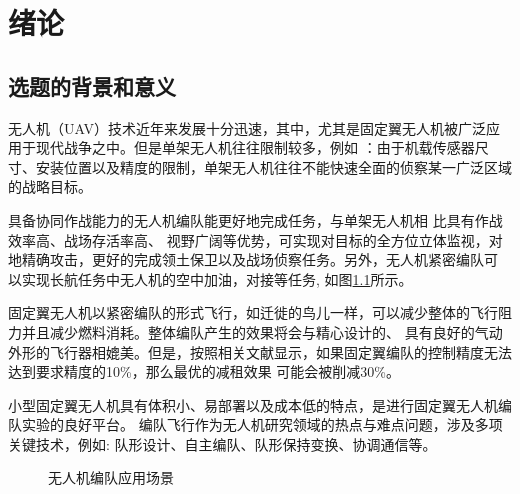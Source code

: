 %
%
%
%

\chapter{绪论}
\label{chap:intro}
\section{选题的背景和意义}
无人机（UAV）技术近年来发展十分迅速，其中，尤其是固定翼无人机被广泛应用于现代战争之中。但是单架无人机往往限制较多，例如
：由于机载传感器尺寸、安装位置以及精度的限制，单架无人机往往不能快速全面的侦察某一广泛区域的战略目标。

具备协同作战能力的无人机编队能更好地完成任务，与单架无人机相 比具有作战效率高、战场存活率高、
视野广阔等优势，可实现对目标的全方位立体监视，对地精确攻击，更好的完成领土保卫以及战场侦察任务。另外，无人机紧密编队可
以实现长航任务中无人机的空中加油，对接等任务, 如图\ref{fig:c01-meaning}所示。

固定翼无人机以紧密编队的形式飞行，如迁徙的鸟儿一样，可以减少整体的飞行阻力并且减少燃料消耗。整体编队产生的效果将会与精心设计的、
具有良好的气动外形的飞行器相媲美。但是，按照相关文献显示，如果固定翼编队的控制精度无法达到要求精度的10\%，那么最优的减租效果
可能会被削减30\%。\cite{Zhang2017Aerodynamics}

小型固定翼无人机具有体积小、易部署以及成本低的特点，是进行固定翼无人机编队实验的良好平台。
编队飞行作为无人机研究领域的热点与难点问题，涉及多项关键技术，例如: 队形设计、自主编队、队形保持变换、协调通信等。
 \begin{figure}[H]
  \centering
  \caption{无人机编队应用场景}
  \label{fig:c01-meaning}
  \end{figure}
